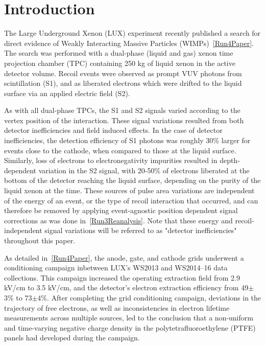 \section{Introduction}\label{section:Intro}

The Large Underground Xenon (LUX) experiment recently published a search for direct evidence of Weakly Interacting Massive Particles (WIMPs)~\ref{Run4Paper}.  The search was performed with a dual-phase (liquid and gas) xenon time projection chamber (TPC) containing 250 kg of liquid xenon in the active detector volume.  Recoil events were observed as prompt VUV photons from scintillation (S1), and as liberated electrons which were drifted to the liquid surface via an applied electric field (S2). 


As with all dual-phase TPCs, the S1 and S2 signals varied according to the vertex position of the interaction.  These signal variations resulted from both detector inefficiencies and field induced effects.  In the case of detector inefficiencies, the detection efficiency of S1 photons was roughly 30\% larger for events close to the cathode, when compared to those at the liquid surface. Similarly, loss of electrons to electronegativity impurities resulted in depth-dependent variation in the S2 signal, with 20-50\% of electrons liberated at the bottom of the detector reaching the liquid surface, depending on the purity of the liquid xenon at the time.  These sources of pulse area variations are independent of the energy of an event, or the type of recoil interaction that occurred, and can therefore be removed by applying event-agnostic position dependent signal corrections as was done in~\ref{Run3Reanalysis}.  Note that these energy and recoil-independent signal variations will be referred to as "detector inefficiencies" throughout this paper. 


As detailed in~\ref{Run4Paper}, the anode, gate, and cathode grids underwent a conditioning campaign inbetween LUX's WS2013 and WS2014–16 data collections.  This campaign increased the operating extraction field from 2.9 kV/cm to 3.5 kV/cm, and the detector's electron extraction efficiency from 49$\pm$3\% to 73$\pm$4\%.  After completing the grid conditioning campaign, deviations in the trajectory of free electrons, as well as inconsistencies in electron lifetime measurements across multiple sources, led to the conclusion that a non-uniform and time-varying negative
charge density in the polytetrafluoroethylene (PTFE)
panels had developed during the campaign.

